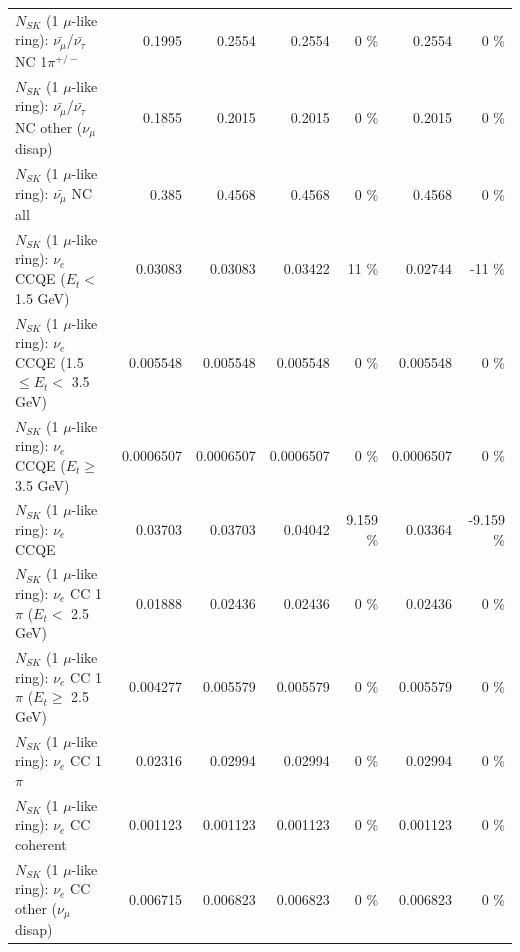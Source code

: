 \begin{table}
\begin{tabular}{| l | r | r | r  r | r  r |}
\hline
  $N_{SK}$ (1 $\mu$-like ring): $\bar{\nu_\mu}$/$\bar{\nu_\tau}$ NC 1$\pi^{+/-}$ &          0.1995 &          0.2554 &          0.2554 &        0 \%  &          0.2554 &        0 \%  \\ 
$N_{SK}$ (1 $\mu$-like ring): $\bar{\nu_\mu}$/$\bar{\nu_\tau}$ NC other ($\nu_\mu$ disap) &          0.1855 &          0.2015 &          0.2015 &        0 \%  &          0.2015 &        0 \%  \\ 
                          $N_{SK}$ (1 $\mu$-like ring): $\bar{\nu_{\mu}}$ NC all &           0.385 &          0.4568 &          0.4568 &        0 \%  &          0.4568 &        0 \%  \\ 
\hline
\hline
\hline
                  $N_{SK}$ (1 $\mu$-like ring): $\nu_e$ CCQE ($E_{t} <$ 1.5 GeV) &         0.03083 &         0.03083 &         0.03422 &       11 \%  &         0.02744 &      -11 \%  \\ 
         $N_{SK}$ (1 $\mu$-like ring): $\nu_e$ CCQE (1.5 $\leq E_{t} <$ 3.5 GeV) &        0.005548 &        0.005548 &        0.005548 &        0 \%  &        0.005548 &        0 \%  \\ 
               $N_{SK}$ (1 $\mu$-like ring): $\nu_e$ CCQE ($E_{t} \geq$ 3.5 GeV) &       0.0006507 &       0.0006507 &       0.0006507 &        0 \%  &       0.0006507 &        0 \%  \\ 
\hline
                                      $N_{SK}$ (1 $\mu$-like ring): $\nu_e$ CCQE &         0.03703 &         0.03703 &         0.04042 &    9.159 \%  &         0.03364 &   -9.159 \%  \\ 
\hline
             $N_{SK}$ (1 $\mu$-like ring): $\nu_e$ CC 1$\pi$ ($E_{t} <$ 2.5 GeV) &         0.01888 &         0.02436 &         0.02436 &        0 \%  &         0.02436 &        0 \%  \\ 
          $N_{SK}$ (1 $\mu$-like ring): $\nu_e$ CC 1$\pi$ ($E_{t} \geq$ 2.5 GeV) &        0.004277 &        0.005579 &        0.005579 &        0 \%  &        0.005579 &        0 \%  \\ 
\hline
                                 $N_{SK}$ (1 $\mu$-like ring): $\nu_e$ CC 1$\pi$ &         0.02316 &         0.02994 &         0.02994 &        0 \%  &         0.02994 &        0 \%  \\ 
                               $N_{SK}$ (1 $\mu$-like ring): $\nu_e$ CC coherent &        0.001123 &        0.001123 &        0.001123 &        0 \%  &        0.001123 &        0 \%  \\ 
                $N_{SK}$ (1 $\mu$-like ring): $\nu_e$ CC other ($\nu_\mu$ disap) &        0.006715 &        0.006823 &        0.006823 &        0 \%  &        0.006823 &        0 \%  \\ 

\end{tabular}
\end{table}
